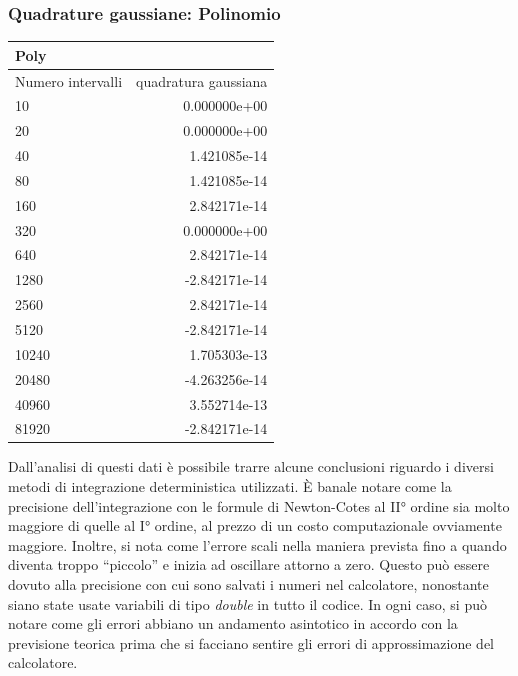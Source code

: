 \subsubsection*{Quadrature gaussiane: Polinomio}
\begin{center}
\begin{longtable}[h]{lr}
\toprule
Poly & \\
\midrule
Numero intervalli & quadratura gaussiana  \\
10	&0.000000e+00 \\
20&	0.000000e+00 \\ 
40&	1.421085e-14 \\
80&	1.421085e-14 \\
160&	2.842171e-14 \\
320&	0.000000e+00 \\
640&	2.842171e-14 \\
1280&	-2.842171e-14 \\ 
2560&	2.842171e-14 \\
5120&	-2.842171e-14 \\ 
10240&	1.705303e-13 \\
20480&	-4.263256e-14 \\
40960&	3.552714e-13 \\ 
81920&	-2.842171e-14 \\
\midrule

\bottomrule
\end{longtable}
 
\end{center}
Dall'analisi di questi dati è possibile trarre alcune conclusioni riguardo i diversi metodi di integrazione deterministica utilizzati.
È banale notare come la precisione dell'integrazione con le formule di Newton-Cotes al II° ordine sia molto maggiore di quelle al I° ordine, al prezzo di un costo computazionale ovviamente maggiore.
Inoltre, si nota come l'errore scali nella maniera prevista fino a quando diventa troppo ``piccolo'' e inizia ad oscillare attorno a zero.
Questo può essere dovuto alla precisione con cui sono salvati i numeri nel calcolatore, nonostante siano state usate variabili di tipo \emph{double} in tutto il codice.
In ogni caso, si può notare come gli errori abbiano un andamento asintotico in accordo con la previsione teorica prima che si facciano sentire gli errori di approssimazione del calcolatore.
 

